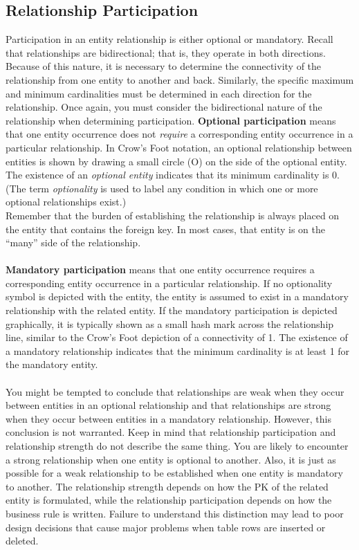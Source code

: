 \documentclass[a4paper, 12pt, titlepage]{report}
\begin{document}
{\subsection{Relationship Participation}
Participation in an entity relationship is either optional or mandatory. Recall that relationships are bidirectional; that is, they operate in both directions. Because of this nature, it is necessary to determine the connectivity of the relationship from one entity to another and back. Similarly, the specific maximum and minimum cardinalities must be determined in each direction for the relationship. Once again, you must consider the bidirectional nature of the relationship when determining participation.
\textbf{Optional participation} means that one entity occurrence does not \emph{require} a corresponding entity occurrence in a particular relationship. In Crow’s Foot notation, an optional relationship between entities is shown by drawing a small circle (O) on the side of the optional entity. The existence of an \emph{optional entity} indicates that its minimum cardinality is 0. (The term \emph{optionality} is used to label any condition in which one or more optional relationships exist.)\\
Remember that the burden of establishing the relationship is always placed on the entity that contains the foreign key. In most cases, that entity is on the “many” side of the relationship.\\ \\
\textbf{Mandatory participation} means that one entity occurrence requires a corresponding entity occurrence in a particular relationship. If no optionality symbol is depicted
with the entity, the entity is assumed to exist in a mandatory relationship with the related entity. If the mandatory participation is depicted graphically, it is typically shown as a small hash mark across the relationship line, similar to the Crow’s Foot depiction of a connectivity of 1. The existence of a mandatory relationship indicates that the minimum
cardinality is at least 1 for the mandatory entity.\\ \\
You might be tempted to conclude that relationships are weak when they occur between entities in an optional relationship and that relationships are strong when they occur between entities in a mandatory relationship. However, this conclusion is not warranted. Keep in mind that relationship participation and relationship strength do not describe the same thing. You are likely to encounter a strong relationship when one entity is optional to another. Also, it is just as possible for a weak relationship to be established when one entity is mandatory to another. The relationship strength depends on how the PK of the related entity is formulated, while the relationship participation depends on how the business rule is written. Failure to understand this distinction may lead to poor design decisions that cause major problems when table rows are inserted or deleted.\\\\
}
\end{document}
